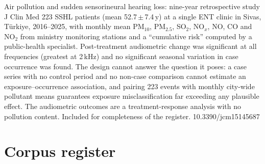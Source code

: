 \documentclass[10pt]{article}
\begin{document}
{Air pollution and sudden sensorineural hearing loss: nine-year retrospective study}
{J Clin Med}
{223 SSHL patients (mean 52.7\,$\pm$\,7.4\,y) at a single ENT clinic in Sivas, T\"urkiye,
2016--2025, with monthly mean PM$_{10}$, PM$_{2.5}$, SO$_2$, NO$_x$, NO, CO and NO$_2$ from
ministry monitoring stations and a ``cumulative risk'' computed by a public-health
specialist. Post-treatment audiometric change was significant at all frequencies
(greatest at 2\,kHz) and no significant seasonal variation in case occurrence was found.
The design cannot answer the question it poses: a case series with no control period and
no non-case comparison cannot estimate an exposure--occurrence association, and pairing
223 events with monthly city-wide pollutant means guarantees exposure misclassification
far exceeding any plausible effect. The audiometric outcomes are a treatment-response
analysis with no pollution content. Included for completeness of the register.}
{10.3390/jcm15145687}

\clearpage

\section*{\sffamily\bfseries\color{Deep}Corpus register}
\vspace{-1.5mm}{\color{Amber}\rule{\linewidth}{1.1pt}}\vspace{2.5mm}


\end{document}
